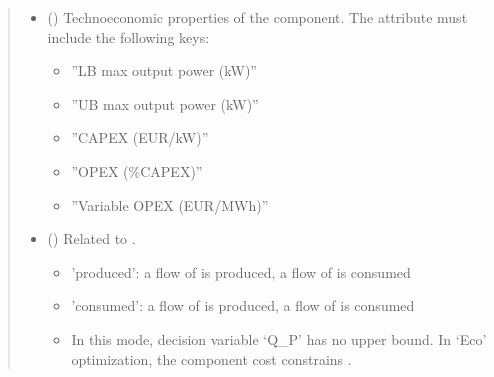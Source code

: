 \documentclass[letterpaper,10pt,english]{sphinxmanual}
\begin{document}
\begin{fulllineitems}
\begin{fulllineitems}
\begin{quote}
\begin{description}
\begin{itemize}
\item {} 
\sphinxAtStartPar
{} (\sphinxstyleliteralemphasis{\sphinxupquote{ | }}) \textendash{} 
\sphinxAtStartPar
Techno\sphinxhyphen{}economic properties of the component.
The  attribute must include the following keys:
\begin{itemize}
\item {} 
\sphinxAtStartPar
”LB max output power (kW)”

\item {} 
\sphinxAtStartPar
”UB max output power (kW)”

\item {} 
\sphinxAtStartPar
”CAPEX (EUR/kW)”

\item {} 
\sphinxAtStartPar
”OPEX (\%CAPEX)”

\item {} 
\sphinxAtStartPar
”Variable OPEX (EUR/MWh)”

\end{itemize}


\item {} 
\sphinxAtStartPar
{} (\sphinxstyleliteralemphasis{\sphinxupquote{, }}\sphinxstyleliteralemphasis{\sphinxupquote{, }}\sphinxstyleliteralemphasis{\sphinxupquote{, }}\sphinxstyleliteralemphasis{\sphinxupquote{, }}) \textendash{} 
\sphinxAtStartPar
Related to .
\begin{itemize}
\item {} 
\sphinxAtStartPar
’produced’: a flow of  is produced, a flow of  is consumed

\item {} 
\sphinxAtStartPar
’consumed’: a flow of  is produced, a flow of  is consumed

\item {} \begin{description}
\sphinxAtStartPar
In this mode, decision variable ‘Q\_P’ has no upper bound.
In ‘Eco’ optimization, the component cost constrains .


\end{description}
\end{itemize}
\end{itemize}
\end{description}
\end{quote}
\end{fulllineitems}
\end{fulllineitems}
\end{document}
